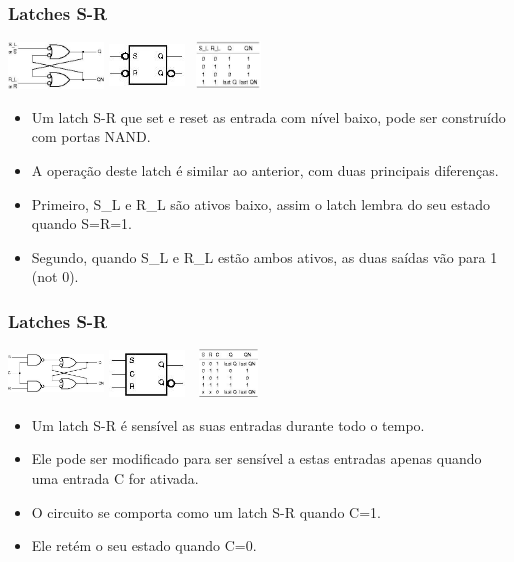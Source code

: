 \documentclass{beamer}
\begin{document}
\begin{frame}
  \frametitle{Latches S-R}
 \begin{center}
  \includegraphics[height = 0.5in, width = 1in]{slide18_filomeno} 
  \includegraphics[height = 0.5in, width = 0.8in]{slide18_filomeno2} 
  \includegraphics[height = 0.5in, width = 0.8in]{slide18_filomeno3} 
 \end{center}
 \begin{itemize}
  \item Um latch S-R que set e reset as entrada com nível baixo, pode ser construído com portas NAND.\pause
  \item A operação deste latch é similar ao anterior, com duas principais diferenças.\pause
  \item Primeiro, S\_L e R\_L são ativos baixo, assim o latch lembra do seu estado quando S=R=1.\pause
  \item Segundo, quando S\_L e R\_L estão ambos ativos, as duas saídas vão para 1 (not 0).
 \end{itemize}
\end{frame}

\begin{frame}
  \frametitle{Latches S-R}
 \begin{center}
  \includegraphics[height = 0.5in, width = 1in]{slide19_filomeno} 
  \includegraphics[height = 0.5in, width = 0.8in]{slide19_filomeno2} 
  \includegraphics[height = 0.5in, width = 0.8in]{slide19_filomeno3} 
 \end{center}
 \begin{itemize}
  \item Um latch S-R é sensível as suas entradas durante todo o tempo.\pause
  \item Ele pode ser modificado para ser sensível a estas entradas apenas quando uma entrada C for ativada.\pause
  \item O circuito se comporta como um latch S-R quando C=1.\pause
  \item Ele retém o seu estado quando C=0.
 \end{itemize}
\end{frame}
\end{document}
